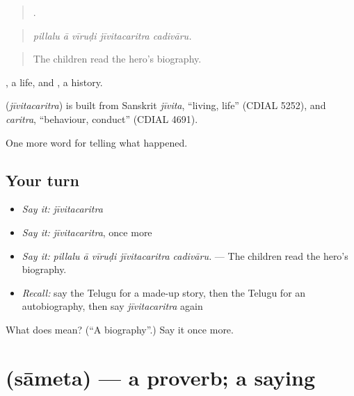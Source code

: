 \begin{quote}
    .
\end{quote}

\begin{quote}
\emph{pillalu ā vīruḍi jīvitacaritra cadivāru.}
\end{quote}

\begin{quote}
The children read the hero's biography.
\end{quote}

, a life, and , a history.

\begin{cousinweb}
\textbf{} (\emph{jīvitacaritra}) is built from Sanskrit \emph{jīvita}, \textquotedblleft{}living, life\textquotedblright{} (CDIAL 5252), and \emph{caritra}, \textquotedblleft{}behaviour, conduct\textquotedblright{} (CDIAL 4691).
\end{cousinweb}

\begin{grammarlens}[title={What you've built}]
One more word for telling what happened.
\end{grammarlens}

\subsection*{Your turn}
\begin{itemize}
\raggedright
  \item \emph{Say it:} \emph{jīvitacaritra}
  \item \emph{Say it:} \emph{jīvitacaritra}, once more
  \item \emph{Say it:} \emph{pillalu ā vīruḍi jīvitacaritra cadivāru.} — The children read the hero's biography.
  \item \emph{Recall:} say the Telugu for a made-up story, then the Telugu for an autobiography, then say \emph{jīvitacaritra} again
\end{itemize}

\begin{tcolorbox}[breakable,colback=teal!4,colframe=teal!35!black,title={Before you move on}]
What does  mean? (\textquotedblleft{}A biography\textquotedblright{}.) Say it once more.
\end{tcolorbox}
\section[\texorpdfstring{\te{సామెత} (sāmeta)}{సామెత (sāmeta)}]{ (sāmeta) — a proverb; a saying}

